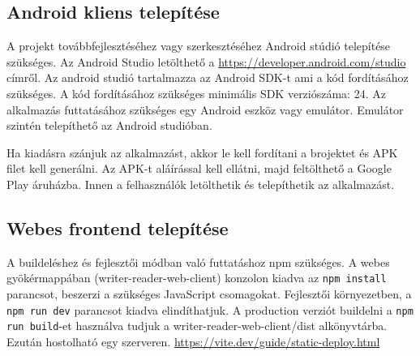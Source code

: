 \subsection{Android kliens telepítése}
A projekt továbbfejlesztéséhez vagy szerkesztéséhez Android stúdió telepítése szükséges. 
Az Android Studio letölthető a \url{https://developer.android.com/studio} címről. 
Az android studió tartalmazza az Android SDK-t ami a kód fordításához szükséges. A kód fordításához szükséges minimális SDK verziószáma: 24.
Az alkalmazás futtatásához szükséges egy Android eszköz vagy emulátor. 
Emulátor szintén telepíthető az Android studióban.

\par
Ha kiadásra szánjuk az alkalmazást, akkor le kell fordítani a brojektet és APK filet kell generálni. 
Az APK-t aláírással kell ellátni, majd feltölthető a Google Play áruházba. 
Innen a felhasználók letölthetik és telepíthetik az alkalmazást.

\subsection{Webes frontend telepítése}
A buildeléshez és fejlesztői módban való futtatáshoz npm szükséges.
A webes gyökérmappában (writer-reader-web-client) konzolon kiadva az \texttt{npm install} parancsot, beszerzi a szükséges JavaScript csomagokat.
Fejlesztői környezetben, a \texttt{npm run dev} parancsot kiadva elindíthatjuk.
A production verziót buildelni a \texttt{npm run build}-et használva tudjuk a writer-reader-web-client/dist alkönyvtárba.
Ezután hostolható egy szerveren. \url{https://vite.dev/guide/static-deploy.html}